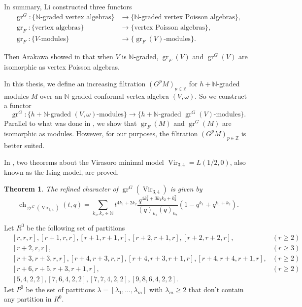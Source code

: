 \documentclass[a4paper, 12pt, reqno]{amsart}
\newtheorem{theorem}{Theorem}[section]
\theoremstyle{remark}
\numberwithin{equation}{subsection}
\DeclareMathOperator{\Vir}{Vir}
\DeclareMathOperator{\gr}{gr}
\DeclareMathOperator{\ch}{ch}
\begin{document}
In summary, Li constructed three functors
\begin{align*}
  \gr^G: \{\text{$\mathbb{N}$-graded vertex algebras}\} &\to \{\text{$\mathbb{N}$-graded vertex Poisson algebras}\}, \\
  \gr_F: \{\text{vertex algebras}\} &\to \{\text{vertex Poisson algebras}\}, \\
  \gr_F: \{\text{$V$-modules}\} &\to \{\text{$\gr_F(V)$-modules}\}.
\end{align*}

Then Arakawa showed in \cite[Proposition 2.6.1]{arakawa_remark_2012} that when $V$ is $\mathbb{N}$-graded, $\gr_F(V)$ and $\gr^G(V)$ are isomorphic as vertex Poisson algebras.

In this thesis, we define an increasing filtration $(G^pM)_{p \in \mathbb{Z}}$ for $h + \mathbb{N}$-graded modules $M$ over an $\mathbb{N}$-graded conformal vertex algebra $(V, \omega)$.
So we construct a functor
\begin{equation*}
  \gr^G: \{\text{$h + \mathbb{N}$-graded $(V, \omega)$-modules}\} \to \{\text{$h + \mathbb{N}$-graded $\gr^G(V)$-modules}\}.
\end{equation*}
Parallel to what was done in \cite{arakawa_remark_2012}, we show that $\gr_F(M)$ and $\gr^G(M)$ are isomorphic as modules.
However, for our purposes, the filtration $(G^pM)_{p \in \mathbb{Z}}$ is better suited.

In \cite{andrews_singular_2022}, two theorems about the Virasoro minimal model $\Vir_{3, 4} = L(1/2, 0)$, also known as the Ising model, are proved.

\begin{theorem}
  \label{thr:1}
  The refined character of $\gr^G(\Vir_{3,4})$ is given by
  \begin{equation*}
    \ch_{\gr^G(\Vir_{3, 4})}(t, q) = \sum_{k_1, k_2 \in \mathbb{N}}t^{4k_1 + 2k_2}\frac{q^{4k_1^2 + 3k_1k_2 + k_2^2}}{(q)_{k_1}(q)_{k_2}}(1 - q^{k_1} + q^{k_1 + k_2}).
  \end{equation*}
\end{theorem}

Let $R^0$ be the following set of partitions
\begin{align*}
  &[r, r, r], [r + 1, r, r], [r + 1, r + 1, r], [r + 2, r + 1, r], [r + 2, r + 2, r], &(r \ge 2) \\
  &[r + 2, r, r], &(r \ge 3) \\
  &[r + 3, r + 3, r, r], [r + 4, r + 3, r, r],  [r + 4, r + 3, r + 1, r], [r + 4, r + 4, r + 1, r], &(r \ge 2) \\
  &[r + 6, r + 5, r + 3, r + 1, r], &(r \ge 2) \\
  &[5, 4, 2, 2], [7, 6, 4, 2, 2], [7, 7, 4, 2, 2], [9, 8, 6, 4, 2, 2].
\end{align*}
Let $P^0$ be the set of partitions $\lambda = [\lambda_1, \dots, \lambda_m]$ with $\lambda_m \ge 2$ that don't contain any partition in $R^0$.
\end{document}
